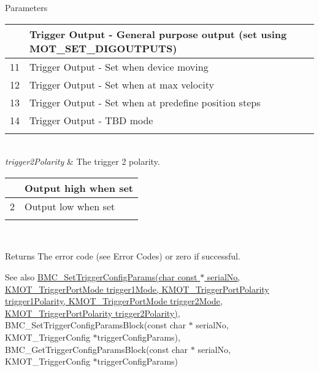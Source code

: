 \begin{DoxyParams}{Parameters}
\begin{tabularx}{\linewidth}{|*{2}{>{\raggedright\arraybackslash}X|}}
10&Trigger Output -\/ General purpose output (set using M\+O\+T\+\_\+\+S\+E\+T\+\_\+\+D\+I\+G\+O\+U\+T\+P\+U\+TS) \\\cline{1-2}
11&Trigger Output -\/ Set when device moving \\\cline{1-2}
12&Trigger Output -\/ Set when at max velocity \\\cline{1-2}
13&Trigger Output -\/ Set when at predefine position steps \\\cline{1-2}
14&Trigger Output -\/ T\+BD mode \\\cline{1-2}
\end{tabularx}
\\
\hline
{\em trigger2\+Polarity} & The trigger 2 polarity.\begin{tabularx}{\linewidth}{|*{2}{>{\raggedright\arraybackslash}X|}}\hline
1&Output high when set \\\cline{1-2}
2&Output low when set \\\cline{1-2}
\end{tabularx}
\\
\hline
\end{DoxyParams}
\begin{DoxyReturn}{Returns}
The error code (see Error Codes) or zero if successful. 
\end{DoxyReturn}
\begin{DoxySeeAlso}{See also}
\hyperlink{group___k_cube_brushless_motor_gac9c33c4a314b9105a339b3509ee9185d}{B\+M\+C\+\_\+\+Set\+Trigger\+Config\+Params(char const $\ast$ serial\+No, K\+M\+O\+T\+\_\+\+Trigger\+Port\+Mode trigger1\+Mode, K\+M\+O\+T\+\_\+\+Trigger\+Port\+Polarity trigger1\+Polarity, K\+M\+O\+T\+\_\+\+Trigger\+Port\+Mode trigger2\+Mode, K\+M\+O\+T\+\_\+\+Trigger\+Port\+Polarity trigger2\+Polarity)}, B\+M\+C\+\_\+\+Set\+Trigger\+Config\+Params\+Block(const char $\ast$ serial\+No, K\+M\+O\+T\+\_\+\+Trigger\+Config $\ast$trigger\+Config\+Params), B\+M\+C\+\_\+\+Get\+Trigger\+Config\+Params\+Block(const char $\ast$ serial\+No, K\+M\+O\+T\+\_\+\+Trigger\+Config $\ast$trigger\+Config\+Params)


\end{DoxySeeAlso}
